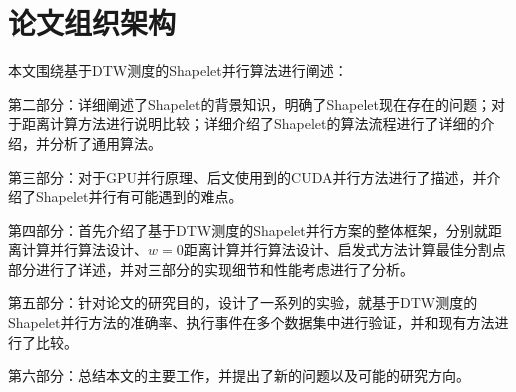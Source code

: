 \section{论文组织架构}
本文围绕基于DTW测度的Shapelet并行算法进行阐述：

第二部分：详细阐述了Shapelet的背景知识，明确了Shapelet现在存在的问题；对于距离计算方法进行说明比较；详细介绍了Shapelet的算法流程进行了详细的介绍，并分析了通用算法。

第三部分：对于GPU并行原理、后文使用到的CUDA并行方法进行了描述，并介绍了Shapelet并行有可能遇到的难点。

第四部分：首先介绍了基于DTW测度的Shapelet并行方案的整体框架，分别就距离计算并行算法设计、$w=0$距离计算并行算法设计、启发式方法计算最佳分割点部分进行了详述，并对三部分的实现细节和性能考虑进行了分析。

第五部分：针对论文的研究目的，设计了一系列的实验，就基于DTW测度的Shapelet并行方法的准确率、执行事件在多个数据集中进行验证，并和现有方法进行了比较。

第六部分：总结本文的主要工作，并提出了新的问题以及可能的研究方向。
